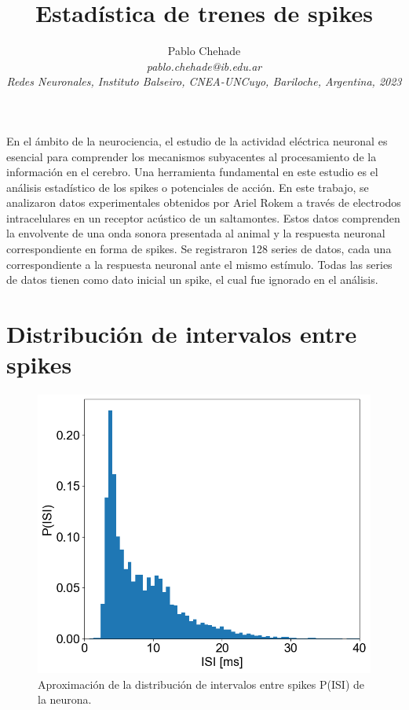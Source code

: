 \documentclass[aps,prb,twocolumn,superscriptaddress,floatfix,longbibliography]{revtex4-2}
\newcounter{para}
\begin{document}
\newcommand{\mytitle}{Estadística de trenes de spikes}

\title{\mytitle}

\author{Pablo Chehade \\
    \small \textit{pablo.chehade@ib.edu.ar} \\
    \small \textit{Redes Neuronales, Instituto Balseiro, CNEA-UNCuyo, Bariloche, Argentina, 2023} \\}
    
    
    
\maketitle

En el ámbito de la neurociencia, el estudio de la actividad eléctrica neuronal es esencial para comprender los mecanismos subyacentes al procesamiento de la información en el cerebro. Una herramienta fundamental en este estudio es el análisis estadístico de los spikes o potenciales de acción. En este trabajo, se analizaron datos experimentales obtenidos por Ariel Rokem a través de electrodos intracelulares en un receptor acústico de un saltamontes. Estos datos comprenden la envolvente de una onda sonora presentada al animal y la respuesta neuronal correspondiente en forma de spikes. Se registraron 128 series de datos, cada una correspondiente a la respuesta neuronal ante el mismo estímulo. Todas las series de datos tienen como dato inicial un spike, el cual fue ignorado en el análisis.

\section{Distribución de intervalos entre spikes}

\begin{figure}[h]
  \includegraphics[clip=true,width=0.8\columnwidth]{ISI_histogram.png}
  \caption{Aproximación de la distribución de intervalos entre spikes P(ISI) de la neurona.}
   \label{fig:ISI_histogram}
\end{figure}
\end{document}
